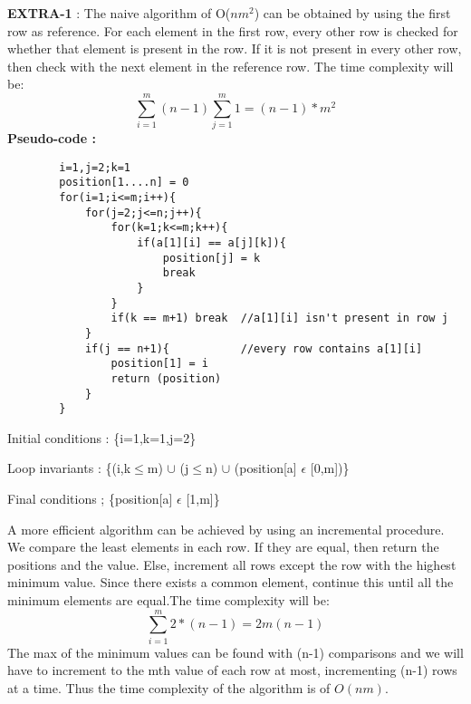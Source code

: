 \documentclass[12pt]{article}
\begin{document}
\begin{enumerate}
    \textbf{EXTRA-1} : 
    The naive algorithm of O($nm^2$) can be obtained by using the first row as reference. For each element in the first row, every other row is checked for whether that element is present in the row. If it is not present in every other row, then check with the next element in the reference row.
    The time complexity will be:
    \[\sum_{i=1}^{m}(n-1)\sum_{j=1}^{m}1 = (n-1)*m^2 \]
    \textbf{Pseudo-code :}
    \begin{verbatim}
        i=1,j=2;k=1
        position[1....n] = 0
        for(i=1;i<=m;i++){
            for(j=2;j<=n;j++){
                for(k=1;k<=m;k++){
                    if(a[1][i] == a[j][k]){
                        position[j] = k
                        break
                    }
                }
                if(k == m+1) break  //a[1][i] isn't present in row j
            }
            if(j == n+1){           //every row contains a[1][i]
                position[1] = i
                return (position)
            }
        }
    \end{verbatim}
    Initial conditions : \{i=1,k=1,j=2\}
    
    Loop invariants : \{(i,k$\leq$m) $\cup$ (j$\leq$n) $\cup$ (position[a] $\epsilon$ [0,m])\}
    
    Final conditions ; \{position[a] $\epsilon$ [1,m]\}
    
    A more efficient algorithm can be achieved by using an incremental procedure. We compare the least elements in each row. If they are equal, then return the positions and the value. Else, increment all rows except the row with the highest minimum value. Since there exists a common element, continue this until all the minimum elements are equal.The time complexity will be: 
    \[\sum_{i=1}^{m}2*(n-1) = 2m(n-1)\]
    The max of the minimum values can be found with (n-1) comparisons and we will have to increment to the mth value of each row at most, incrementing (n-1) rows at a time. Thus the time complexity of the algorithm is of $O(nm)$.
    

\end{enumerate}
\end{document}
